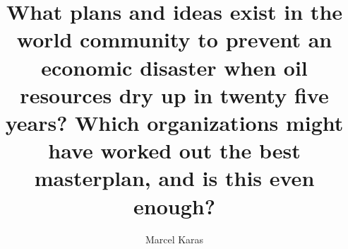 

\thispagestyle{otherpage} %
\title{What plans and ideas exist in the world community to prevent an economic disaster when oil resources dry up in twenty five years? Which organizations might have worked out the best masterplan, and is this even enough?}
\author{Marcel Karas}
\note{\today}

\maketitle
\newpage
\tableofcontents
\newpage
\vfill

\vfill

\vfill

\vfill
\newpage
\printbibliography


